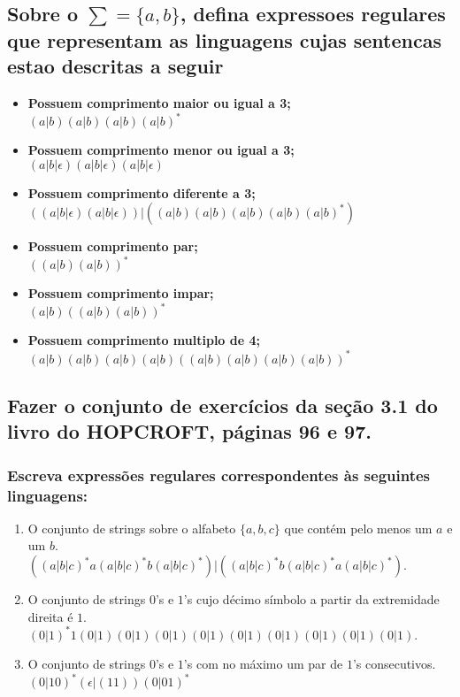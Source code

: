     \subsection{Sobre o $\sum = \{a,b\}$, defina expressoes regulares que representam as linguagens cujas sentencas estao descritas a seguir} 
    \begin{itemize}
        \item \textbf{Possuem comprimento maior ou igual a 3;}
            \\ $(a|b)(a|b)(a|b)(a|b)^*$
        \item \textbf{Possuem comprimento menor ou igual a 3;}
            \\ $(a|b|\epsilon)(a|b|\epsilon)(a|b|\epsilon)$
        \item \textbf{Possuem comprimento diferente a 3;}
            \\ $((a|b|\epsilon)(a|b|\epsilon))|((a|b)(a|b)(a|b)(a|b)(a|b)^*)$
        \item \textbf{Possuem comprimento par;}
            \\ $((a|b)(a|b))^*$
        \item \textbf{Possuem comprimento impar;}
            \\ $(a|b)((a|b)(a|b))^*$
        \item \textbf{Possuem comprimento multiplo de 4;}
            \\ $(a|b)(a|b)(a|b)(a|b)((a|b)(a|b)(a|b)(a|b))^*$
    \end{itemize}

    \subsection{Fazer o conjunto de exercícios da seção 3.1 do livro do HOPCROFT, páginas 96 e 97.} 
        \subsubsection{Escreva expressões regulares corresponden\-tes às seguintes linguagens:}
            \begin{enumerate}[label={\bfseries \alph*)}]
                \item O conjunto de strings sobre o alfabeto $\{a, b, c\}$ que contém pelo menos um $a$ e um $b$.
                    \\ $((a|b|c)^* a(a|b|c)^* b(a|b|c)^*)|((a|b|c)^* b(a|b|c)^* a(a|b|c)^*)$.
                \item O conjunto de strings $0$'s e $1$'s cujo décimo símbolo a partir da extremidade direita é $1$.
                    \\ $(0|1)^* 1 (0|1)(0|1)(0|1)(0|1)(0|1)(0|1)(0|1)(0|1)(0|1)$.
                \item O conjunto de strings $0$'s e $1$'s com no máximo um par de $1$'s consecutivos.
                    \\ $(0|10)^*(\epsilon|(11))(0|01)^*$
            \end{enumerate}
            
